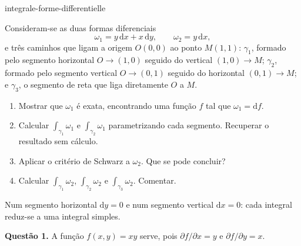 
\begin{exo}{integrale-forme-differentielle}

Consideram-se as duas formas diferenciais
\[\omega_1=y\,\mathrm{d}x+x\,\mathrm{d}y,\qquad \omega_2=y\,\mathrm{d}x,\]
e três caminhos que ligam a origem $O(0,0)$ ao ponto $M(1,1)$: $\gamma_1$,
formado pelo segmento horizontal $O\to(1,0)$ seguido do vertical $(1,0)\to M$;
$\gamma_2$, formado pelo segmento vertical $O\to(0,1)$ seguido do horizontal
$(0,1)\to M$; e $\gamma_3$, o segmento de reta que liga diretamente $O$ a $M$.

\begin{enumerate}
\item Mostrar que $\omega_1$ é exata, encontrando uma função $f$ tal que $\omega_1=\mathrm{d}f$.
\item Calcular $\int_{\gamma_1}\omega_1$ e $\int_{\gamma_2}\omega_1$ parametrizando cada segmento. Recuperar o resultado sem cálculo.
\item Aplicar o critério de Schwarz a $\omega_2$. Que se pode concluir?
\item Calcular $\int_{\gamma_1}\omega_2$, $\int_{\gamma_2}\omega_2$ e $\int_{\gamma_3}\omega_2$. Comentar.
\end{enumerate}

\begin{indication}
Num segmento horizontal $\mathrm{d}y=0$ e num segmento vertical $\mathrm{d}x=0$:
cada integral reduz-se a uma integral simples.
\end{indication}

\begin{solution}
\textbf{Questão 1.} A função $f(x,y)=xy$ serve, pois $\partial f/\partial x=y$ e $\partial f/\partial y=x$.


\end{solution}
\end{exo}
